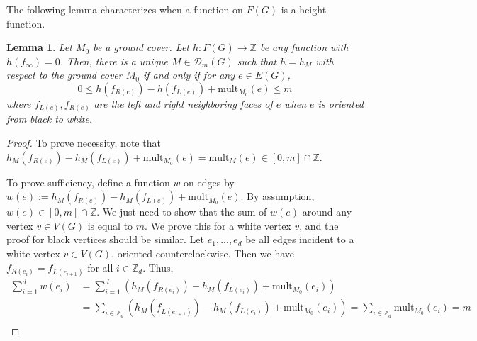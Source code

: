 \documentclass[11pt]{amsart}
\newtheorem{lem}[thm]{Lemma}
\theoremstyle{definition}
\theoremstyle{remark}
\numberwithin{equation}{section}
\begin{document}
The following lemma characterizes when a function on $F(G)$ is a height function.
\begin{lem}\label{lem: inequalities_for_heights}
    Let $M_0$ be a ground cover. Let $h: F(G)\rightarrow \mathbb{Z}$ be any function with $h(f_{\infty})=0$. Then, there is a unique $M\in \mathcal{D}_{m}(G)$ such that $h = h_M$ with respect to the ground cover $M_0$ if and only if for any $e\in E(G)$,
    \begin{equation}\label{ineq: defining_conditions_for_heights}
        0\leq h(f_{R(e)})-h(f_{L(e)}) + \text{mult}_{M_0}(e)\leq m
    \end{equation}
    where $f_{L(e)}, f_{R(e)}$ are the left and right neighboring faces of $e$ when $e$ is oriented from black to white.  
\end{lem}
\begin{proof}
    To prove necessity, note that $h_M(f_{R(e)})-h_M(f_{L(e)}) + \text{mult}_{M_0}(e) = \text{mult}_M(e)\in [0,m]\cap \mathbb{Z}$.

    To prove sufficiency, define a function $w$ on edges by $w(e) := h_M(f_{R(e)})-h_M(f_{L(e)}) + \text{mult}_{M_0}(e)$. By assumption, $w(e)\in [0,m]\cap \mathbb{Z}$. We just need to show that the sum of $w(e)$ around any vertex $v\in V(G)$ is equal to $m$. We prove this for a white vertex $v$, and the proof for black vertices should be similar. Let $e_1,...,e_d$ be all edges incident to a white vertex $v\in V(G)$, oriented counterclockwise. Then we have $f_{R(e_i)} = f_{L(e_{i+1})}$ for all $i\in \mathbb{Z}_d$. Thus, 
    \begin{equation*}
        \begin{split}
            \sum^d_{i=1}w(e_i) &= \sum^d_{i=1}(h_M(f_{R(e_i)})-h_M(f_{L(e_i)}) + \text{mult}_{M_0}(e_i))\\
            &= \sum_{i\in \mathbb{Z}_d}(h_M(f_{L(e_{i+1})})-h_M(f_{L(e_i)}) + \text{mult}_{M_0}(e_i))=\sum_{i\in \mathbb{Z}_d}\text{mult}_{M_0}(e_i) = m\\
        \end{split}
    \end{equation*}
\end{proof}
\end{document}
